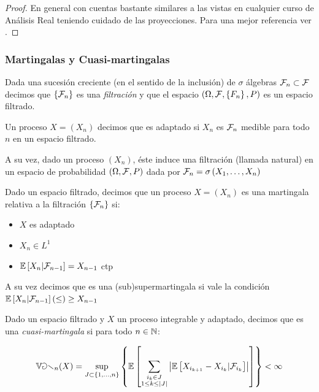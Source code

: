 \begin{proof}
	En general con cuentas bastante similares a las vistas en cualquier curso de An\'alisis Real teniendo cuidado de las proyecciones. Para una mejor referencia ver \cite{williams:1991}.
\end{proof}

\subsubsection{Martingalas y Cuasi-martingalas}

\begin{definition}
	Dada una sucesi\'on creciente (en el sentido de la inclusi\'on) de $\sigma$ \'algebras $\mathcal{F}_n \subset \mathcal{F}$ decimos que $\left\lbrace\mathcal{F}_n\right\rbrace$ es una \textit{filtraci\'on} y que el espacio $\left(\Omega, \mathcal{F}, \left\lbrace F_n\right\rbrace, P\right)$ es un espacio filtrado.
	
	Un proceso $X  = \left(X_n\right)$ decimos que es adaptado si $X_n $ es $\mathcal{F}_n$ medible para todo $n$ en un espacio filtrado.
	
	A su vez, dado un proceso $\left(X_n\right)$, \'este induce una filtraci\'on (llamada natural) en un espacio de probabilidad $\left(\Omega, \mathcal{F}, P\right)$ dada por $\mathcal{F}_n = \sigma\left(X_1, \dots, X_n \right)$
	
\end{definition}

\begin{definition}
	Dado un espacio filtrado, decimos que un proceso $X = \left(X_n\right)$ es una martingala relativa a la filtraci\'on $\left\lbrace\mathcal{F}_n\right\rbrace$ si:
	
	\begin{itemize}
		\item $X$ es adaptado
		\item $X_n \in L^1$
		\item $\mathbb{E} \left[X_n \vert \mathcal{F}_{n-1}\right] = X_{n-1}$ ctp
	\end{itemize}

	A su vez decimos que es una (sub)supermartingala si vale la condici\'on $\mathbb{E} \left[X_n \vert \mathcal{F}_{n-1}\right] (\leq)\geq X_{n-1}$
	
\end{definition}

\begin{definition}
	Dado un espacio filtrado y $X$ un proceso integrable y adaptado, decimos que es una \textit{cuasi-martingala} si para todo $n \in {\mathbb{N}}$:
	
	\begin{equation}
		\mathbb{Var}_n(X) = \sup\limits_{J \subset \left\lbrace1, \dots, n\right\rbrace} \left\lbrace\mathbb{E} \left[\sum\limits_{\substack{i_k \in J \\ 1 \leq k \leq \left\lvert J\right\rvert}}{\left\lvert\mathbb{E} \left[X_{i_{k+1}} - X_{i_k} \vert \mathcal{F}_{i_{k}}\right]\right\rvert}\right]\right\rbrace < \infty
	\end{equation}
	
\end{definition}

